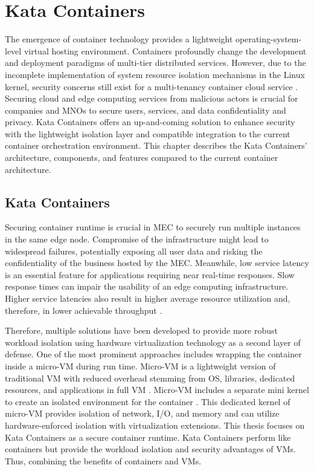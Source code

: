 \chapter{Kata Containers}
\label{chapter:katacontainers}

The emergence of container technology provides a lightweight operating-system-level virtual hosting environment. Containers profoundly change the development and deployment paradigms of multi-tier distributed services. However, due to the incomplete implementation of system resource isolation mechanisms in the Linux kernel, security concerns still exist for a multi-tenancy container cloud service \cite{Gao2017}. Securing cloud and edge computing services from malicious actors is crucial for companies and MNOs to secure users, services, and data confidentiality and privacy. Kata Containers offers an up-and-coming solution to enhance security with the lightweight isolation layer and compatible integration to the current container orchestration environment. This chapter describes the Kata Containers' architecture, components, and features compared to the current container architecture.

\section{Kata Containers}

Securing container runtime is crucial in MEC to securely run multiple instances in the same edge node. Compromise of the infrastructure might lead to widespread failures, potentially exposing all user data and risking the confidentiality of the business hosted by the MEC. Meanwhile, low service latency is an essential feature for applications requiring near real-time responses. Slow response times can impair the usability of an edge computing infrastructure. Higher service latencies also result in higher average resource utilization and, therefore, in lower achievable throughput \cite{EverartsdeVelp2020}.

Therefore, multiple solutions have been developed to provide more robust workload isolation using hardware virtualization technology as a second layer of defense. One of the most prominent approaches includes wrapping the container inside a micro-VM during run time. Micro-VM is a lightweight version of traditional VM with reduced overhead stemming from OS, libraries, dedicated resources, and applications in full VM \cite{Flauzac2020}. Micro-VM includes a separate mini kernel to create an isolated environment for the container \cite{Kumar2020}. This dedicated kernel of micro-VM provides isolation of network, I/O, and memory and can utilize hardware-enforced isolation with virtualization extensions. This thesis focuses on Kata Containers as a secure container runtime. Kata Containers perform like containers but provide the workload isolation and security advantages of VMs. Thus, combining the benefits of containers and VMs. \cite{KataContainers}

